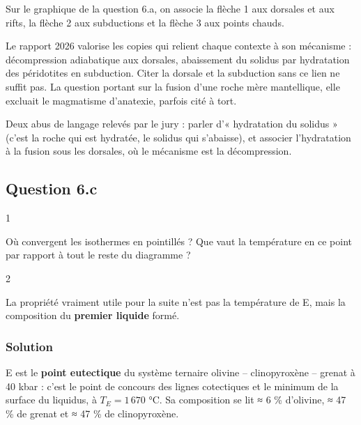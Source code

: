 \documentclass[11pt,a4paper]{article}
\begin{document}
Sur le graphique de la question 6.a, on associe la flèche 1 aux dorsales et aux rifts, la flèche 2 aux subductions et la flèche 3 aux points chauds.

\begin{jury}

Le rapport 2026 valorise les copies qui relient chaque contexte à son mécanisme : décompression adiabatique aux dorsales, abaissement du solidus par hydratation des péridotites en subduction. Citer la dorsale et la subduction sans ce lien ne suffit pas. La question portant sur la fusion d'une roche mère mantellique, elle excluait le magmatisme d'anatexie, parfois cité à tort.

\end{jury}

\begin{piege}

Deux abus de langage relevés par le jury : parler d'« hydratation du solidus » (c'est la roche qui est hydratée, le solidus qui s'abaisse), et associer l'hydratation à la fusion sous les dorsales, où le mécanisme est la décompression.

\end{piege}

\hypertarget{question-6.c}{%
\subsection{Question 6.c}\label{question-6.c}}

\begin{indication}{1}

Où convergent les isothermes en pointillés ? Que vaut la température en ce point par rapport à tout le reste du diagramme ?

\end{indication}

\begin{indication}{2}

La propriété vraiment utile pour la suite n'est pas la température de E, mais la composition du \textbf{premier liquide} formé.

\end{indication}

\hypertarget{solution-18}{%
\subsubsection{Solution}\label{solution-18}}

E est le \textbf{point eutectique} du système ternaire olivine -- clinopyroxène -- grenat à 40 kbar : c'est le point de concours des lignes cotectiques et le minimum de la surface du liquidus, à \(T_E = 1\,670\) °C. Sa composition se lit ≈ 6 \% d'olivine, ≈ 47 \% de grenat et ≈ 47 \% de clinopyroxène.
\end{document}
